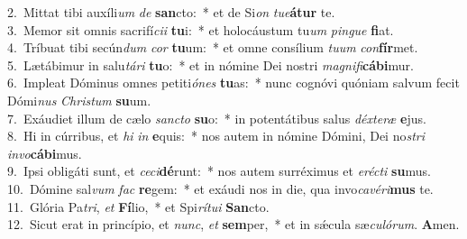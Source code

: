{2.~}Mittat tibi auxíli\textit{um} \textit{de} \textbf{san}cto:~* et de Si\textit{on} \textit{tu}\textit{e}\textbf{á}\textbf{tur} te.\\
{3.~}Memor sit omnis sacrifí\textit{ci}\textit{i} \textbf{tu}i:~* et holocáustum tu\textit{um} \textit{pin}\textit{gue} \textbf{fi}at.\\
{4.~}Tríbuat tibi secún\textit{dum} \textit{cor} \textbf{tu}um:~* et omne consílium \textit{tu}\textit{um} \textit{con}\textbf{fír}met.\\
{5.~}Lætábimur in salu\textit{tá}\textit{ri} \textbf{tu}o:~* et in nómine Dei nostri \textit{ma}\textit{gni}\textit{fi}\textbf{cá}\textbf{bi}mur.\\
{6.~}Impleat Dóminus omnes petiti\textit{ó}\textit{nes} \textbf{tu}as:~* nunc cognóvi quóniam salvum fecit Dómi\textit{nus} \textit{Chri}\textit{stum} \textbf{su}um.\\
{7.~}Exáudiet illum de cælo \textit{san}\textit{cto} \textbf{su}o:~* in potentátibus salus \textit{déx}\textit{te}\textit{ræ} \textbf{e}jus.\\
{8.~}Hi in cúrribus, et \textit{hi} \textit{in} \textbf{e}quis:~* nos autem in nómine Dómini, Dei no\textit{stri} \textit{in}\textit{vo}\textbf{cá}\textbf{bi}mus.\\
{9.~}Ipsi obligáti sunt, et \textit{ce}\textit{ci}\textbf{dé}runt:~* nos autem surréximus et \textit{e}\textit{ré}\textit{cti} \textbf{su}mus.\\
{10.~}Dómine sal\textit{vum} \textit{fac} \textbf{re}gem:~* et exáudi nos in die, qua invo\textit{ca}\textit{vé}\textit{ri}\textbf{mus} te.\\
{11.~}Glória Pa\textit{tri}, \textit{et} \textbf{Fí}lio,~* et Spi\textit{rí}\textit{tu}\textit{i} \textbf{San}cto.\\
{12.~}Sicut erat in princípio, et \textit{nunc}, \textit{et} \textbf{sem}per,~* et in sǽcula sæ\textit{cu}\textit{ló}\textit{rum}. \textbf{A}men.\\
